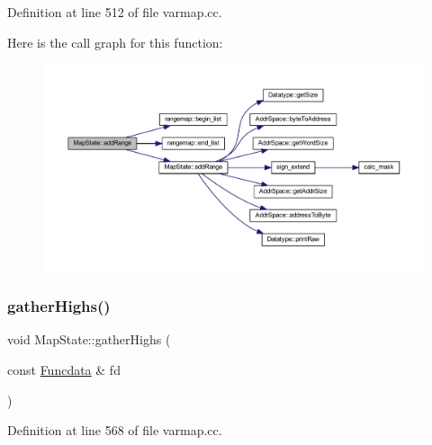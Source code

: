 Definition at line 512 of file varmap.\+cc.

Here is the call graph for this function\+:
\nopagebreak
\begin{figure}[H]
\begin{center}
\leavevmode
\includegraphics[width=350pt]{class_map_state_a0ed32adc04fe0dc1edbbdc63ee693481_cgraph}
\end{center}
\end{figure}
\mbox{\label{class_map_state_ac3a0c8da3331067931f75269daa81aed}} 
\subsubsection{\texorpdfstring{gatherHighs()}{gatherHighs()}}
{\footnotesize\ttfamily void Map\+State\+::gather\+Highs (\begin{DoxyParamCaption}\item[{const \mbox{\hyperlink{class_funcdata}{Funcdata}} \&}]{fd }\end{DoxyParamCaption})}



Definition at line 568 of file varmap.\+cc.

